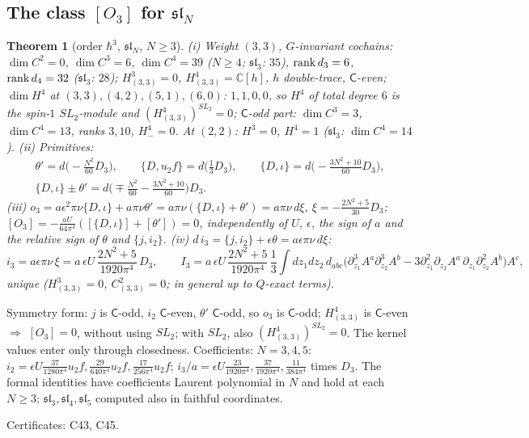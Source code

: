 \documentclass[10pt,a4paper]{article}
\numberwithin{equation}{section}
\newtheorem{theorem}{Theorem}[section]
\theoremstyle{definition}
\theoremstyle{remark}
\newcommand{\fsl}{\mathfrak{sl}}
\newcommand{\cert}[1]{\par\noindent\textup{Certificates: #1.}\par}
\newcommand{\uf}{u_2f}
\newcommand{\Dthree}{D_3}
\begin{document}
\subsection{\texorpdfstring{The class $[O_3]$ for $\fsl_N$}{The class [O3] for sl(N)}}

\begin{theorem}[order $\hbar^3$, $\fsl_N$, $N\ge3$]\label{thm-o3sl}
(i) Weight $(3,3)$, $G$-invariant cochains: $\dim C^2=0$, $\dim C^3=6$, $\dim C^4=39$ ($N\ge4$; $\fsl_3$: $35$), ${\rm rank}\,d_3=6$, ${\rm rank}\,d_4=32$ ($\fsl_3$: $28$); $H^3_{(3,3)}=0$, $H^4_{(3,3)}=\mathbb C[h]$, $h$ double-trace, $\mathsf C$-even; $\dim H^4$ at $(3,3),(4,2),(5,1),(6,0)$: $1,1,0,0$, so $H^4$ of total degree $6$ is the spin-$1$ $SL_2$-module and $(H^4_{(3,3)})^{SL_2}=0$; $\mathsf C$-odd part: $\dim C^3=3$, $\dim C^4=13$, ranks $3,10$, $H^4_-=0$. At $(2,2)$: $H^3=0$, $H^4=1$ ($\fsl_3$: $\dim C^4=14$).
(ii) Primitives:
\begin{equation}
\begin{gathered}\theta'=d\Big(-\frac{N^2}{60}\Dthree\Big),\qquad \{D,\uf\}=d\Big(\frac13\Dthree\Big),\qquad \{D,\iota\}=d\Big(-\frac{3N^2+10}{60}\Dthree\Big),\\ \{D,\iota\}\pm\theta'=d\Big(\mp\frac{N^2}{60}-\frac{3N^2+10}{60}\Big)\Dthree .\end{gathered}
\end{equation}
(iii) $o_3=a\epsilon^2\pi\nu\{D,\iota\}+a\pi\nu\theta'=a\pi\nu(\{D,\iota\}+\theta')=a\pi\nu\,d\xi$, $\xi=-\frac{2N^2+5}{30}\Dthree$; $[O_3]=-\frac{aU}{64\pi^4}([\{D,\iota\}]+[\theta'])=0$, independently of $U$, $\epsilon$, the sign of $a$ and the relative sign of $\theta$ and $\{j,i_2\}$.
(iv) $d\,i_3=\{j,i_2\}+\epsilon\theta=a\epsilon\pi\nu\,d\xi$:
\begin{equation}
i_3=a\epsilon\pi\nu\,\xi=a\,\epsilon U\,\frac{2N^2+5}{1920\pi^4}\,\Dthree,\qquad I_3=a\,\epsilon U\,\frac{2N^2+5}{1920\pi^4}\,\frac13\int dz_1dz_2\,d_{abc}\big(\partial_{z_1}^3A^a\partial_{z_2}^3A^b-3\partial_{z_1}^2\partial_{z_2}A^a\,\partial_{z_1}\partial_{z_2}^2A^b\big)A^c,
\end{equation}
unique ($H^3_{(3,3)}=0$, $C^2_{(3,3)}=0$; in general up to $Q$-exact terms).
\end{theorem}
Symmetry form: $j$ is $\mathsf C$-odd, $i_2$ $\mathsf C$-even, $\theta'$ $\mathsf C$-odd, so $o_3$ is $\mathsf C$-odd; $H^4_{(3,3)}$ is $\mathsf C$-even $\Rightarrow$ $[O_3]=0$, without using $SL_2$; with $SL_2$, also $(H^4_{(3,3)})^{SL_2}=0$. The kernel values enter only through closedness. Coefficients: $N=3,4,5$: $i_2=\epsilon U\frac{37}{1280\pi^4}\uf,\frac{29}{640\pi^4}\uf,\frac{17}{256\pi^4}\uf$; $i_3/a=\epsilon U\frac{23}{1920\pi^4},\frac{37}{1920\pi^4},\frac{11}{384\pi^4}$ times $\Dthree$. The formal identities have coefficients Laurent polynomial in $N$ and hold at each $N\ge3$; $\fsl_3,\fsl_4,\fsl_5$ computed also in faithful coordinates.
\cert{C43, C45}
\end{document}
